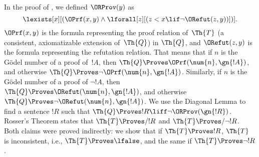 In the proof of , we defined
$\ORProv(y)$ as \[\lexists[x][(\OPrf(x, y) \land \lforall[z][(z < x
    \lif \lnot \ORefut(z, y))])].\] $\OPrf(x,y)$ is the formula
representing the proof relation of~$\Th{T}$ (a consistent,
axiomatizable extension of~$\Th{Q}$) in $\Th{Q}$, and $\ORefut(z, y)$
is the formula representing the refutation relation. That means that
if $n$ is the G\"odel number of a proof of~$!A$, then $\Th{Q} \Proves
\OPrf(\num{n}, \gn{!A})$, and otherwise $\Th{Q} \Proves
\lnot\OPrf(\num{n}, \gn{!A})$. Similarly, if $n$ is the G\"odel number
of a proof of $\lnot !A$, then $\Th{Q} \Proves \ORefut(\num{n},
\gn{!A})$, and otherwise $\Th{Q} \Proves \lnot\ORefut(\num{n},
\gn{!A})$. We use the Diagonal Lemma to find a sentence $!R$ such that
$\Th{Q} \Proves !R \liff \lnot \ORProv(\gn{!R})$. Rosser's Theorem
states that $\Th{T} \Proves/ !R$ and $\Th{T} \Proves/ \lnot !R$. Both
claims were proved indirectly: we show that if $\Th{T} \Proves !R$,
$\Th{T}$ is inconsistent, i.e., $\Th{T} \Proves \lfalse$, and the same
if $\Th{T} \Proves \lnot !R$. 

